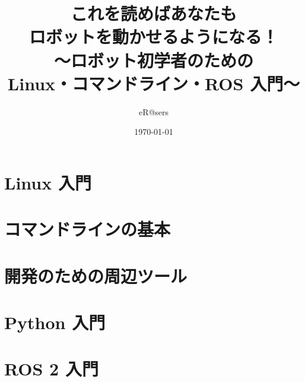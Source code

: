 \documentclass[book,paper=a4,fontsize=10pt,openany]{jlreq}
\title{これを読めばあなたも\\ロボットを動かせるようになる！\\[1em]
  {\large 〜ロボット初学者のための\\Linux・コマンドライン・ROS 入門〜}}
\author{eR@sers}
\date{\today\\[0.5em]{\large \bookversion}}
\begin{document}
\frontmatter
\maketitle

\tableofcontents

\mainmatter
\part{Linux 入門}




\part{コマンドラインの基本}








\part{開発のための周辺ツール}






\part{Python 入門}





\part{ROS 2 入門}












\hoshou
\clearpage{}
\end{document}
